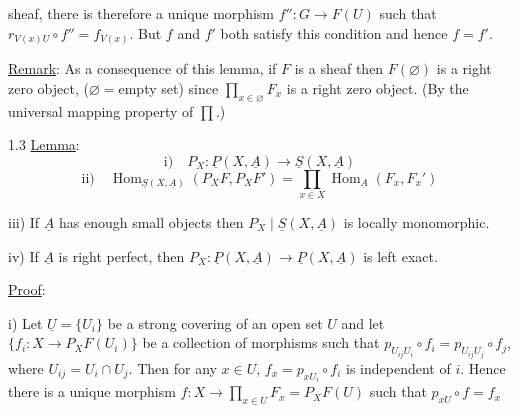 
sheaf, there is therefore a unique morphism $f'':G\longrightarrow F(U)$ such
that $r_{V(x)U}\circ f''=f_{V(x)}$. But $f$ and $f'$ both satisfy this
condition and hence $f=f'$.

\uline{Remark}: As a consequence of this lemma, if $F$ is a sheaf then
$F(\varnothing)$ is a right zero object, ($\varnothing={}$empty set) since
$\prod_{x\in\varnothing}F_x$ is a
right zero object. (By the universal mapping property of $\prod$.)

1.3 \uline{Lemma}:
\[
\text{i)}\quad P_X:\underline{P}(X,\underline{A})\longrightarrow\underline{S}(X,\underline{A})
\]
\[
\text{ii)}\quad
\operatorname{Hom}_{\underline{S}(X,\underline{A})}(P_XF,P_XF')
=\prod_{x\in X}\operatorname{Hom}_{\underline{A}}(F_x,F_x')
\]

iii) If $\underline{A}$ has enough small objects then $P_X\mid\underline{S}(X,\underline{A})$ is
locally monomorphic.

iv) If $\underline{A}$ is right perfect, then
$P_X:\underline{P}(X,\underline{A})\longrightarrow\underline{P}(X,\underline{A})$ is
left exact.

\uline{Proof}:

i) Let $\underline{U}=\{U_i\}$ be a strong covering of an open set $U$ and
let $\{f_i:X\longrightarrow P_XF(U_i)\}$ be a collection of morphisms such that
$p_{U_{ij}U_i}\circ f_i=p_{U_{ij}U_j}\circ f_j$, where $U_{ij}=U_i\cap U_j$. Then for any
$x\in U$, $f_x=p_{xU_i}\circ f_i$ is independent of $i$. Hence there is a
unique morphism $f:X\longrightarrow\prod_{x\in U}F_x=P_XF(U)$ such that $p_{xU}\circ f=f_x$
